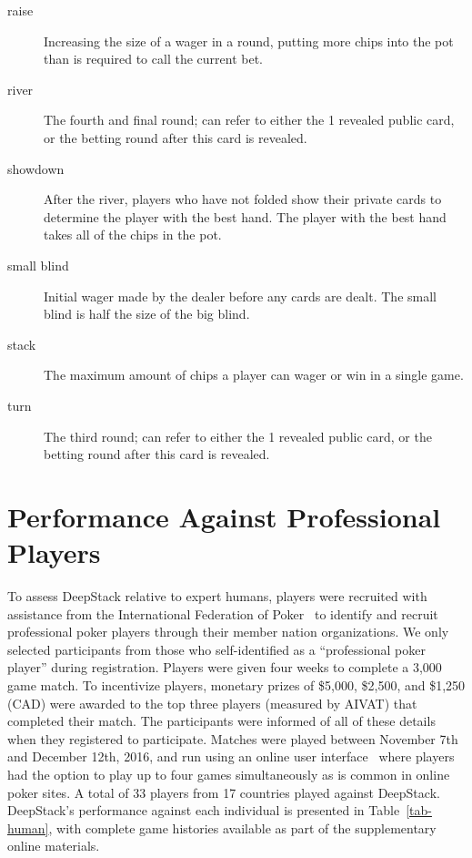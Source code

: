 \begin{description}
\item[raise] Increasing the size of a wager in a round, putting more chips into the pot than is required to call the current bet.
\item[river] The fourth and final round; can refer to either the 1 revealed public card, or the betting round after this card is revealed.
\item[showdown] After the river, players who have not folded show their private cards to determine the player with the best hand.  The player with the best hand takes all of the chips in the pot.
\item[small blind] Initial wager made by the dealer before any cards are dealt.  The small blind is half the size of the big blind.
\item[stack] The maximum amount of chips a player can wager or win in a single game.
\item[turn] The third round; can refer to either the 1 revealed public card, or the betting round after this card is revealed.
\end{description}

\section*{Performance Against Professional Players}

To assess DeepStack relative to expert humans, players were
recruited with assistance from the International Federation of Poker~\cite{IFP} to identify and recruit professional poker players through their 
member nation organizations.  We only selected participants from those who self-identified as a ``professional poker player'' during registration.
Players were given four weeks to complete a 3,000 game match.  To incentivize
players, monetary prizes of \$5,000, \$2,500, and \$1,250 (CAD) were awarded to
the top three players (measured by AIVAT) that completed their match.  
The participants were informed of all of these details when they registered to participate.
Matches
were played between November 7th and December 12th, 2016, and run using an
online user interface~\cite{DustinGUISource} where players had the option to play up to
four games simultaneously as is common in online poker sites.  A total of 33 players from 17 countries played
against DeepStack.  DeepStack's performance against each individual is
presented in Table~\ref{tab-human}, with complete game histories available as part of the supplementary online materials. 

